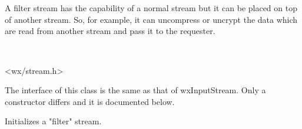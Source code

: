 \section{}\label{wxfilterinputstream}

A filter stream has the capability of a normal stream but it can be placed on top
of another stream. So, for example, it can uncompress or uncrypt the data which are read
from another stream and pass it to the requester.


\\


<wx/stream.h>


The interface of this class is the same as that of wxInputStream. Only a constructor
differs and it is documented below.



Initializes a "filter" stream.

